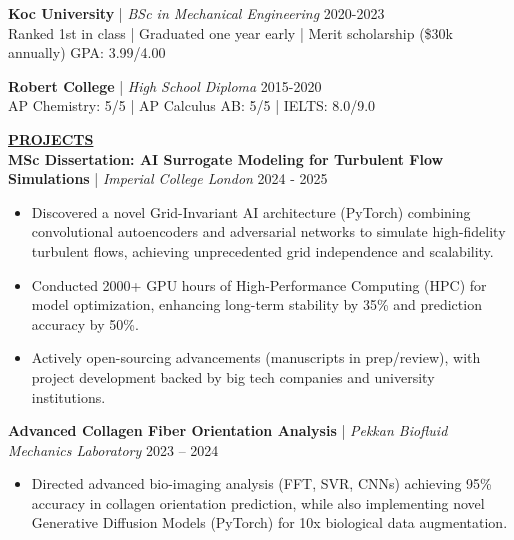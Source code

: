 \documentclass{article}
\newlength{\remaining}
\renewcommand{\section}[1]{
  \vspace{1.0em}\setlength{\remaining}{\textwidth-\widthof{\uppercase{#1}}}
    \noindent\underline{\fontsize{10}{15}\bfseries\uppercase{#1}\hspace*{\remaining}} \\
}
\renewcommand{\subsection}[3]{
    \noindent\textbf{#1} | \emph{#2} \hfill #3  
}
\begin{document}
    \vspace{0.25em}

    \subsection{Koc University}{BSc in Mechanical Engineering}{2020-2023} \\
    Ranked 1st in class | Graduated one year early | Merit scholarship (\$30k annually) \hfill GPA: 3.99/4.00

    \vspace{0.25em}

    \subsection{Robert College}{High School Diploma}{2015-2020} \\
    AP Chemistry: 5/5 | AP Calculus AB: 5/5 | IELTS: 8.0/9.0

    \section{Projects}
    \subsection{MSc Dissertation: AI Surrogate Modeling for Turbulent Flow Simulations}{Imperial College London}{2024 - 2025} 
    \begin{itemize} 
        \item Discovered a novel Grid-Invariant AI architecture (PyTorch) combining convolutional autoencoders and adversarial networks to simulate high-fidelity turbulent flows, achieving unprecedented grid independence and scalability.
        \item Conducted 2000+ GPU hours of High-Performance Computing (HPC) for model optimization, enhancing long-term stability by 35\% and prediction accuracy by 50\%.
        \item Actively open-sourcing advancements (manuscripts in prep/review), with project development backed by big tech companies and university institutions.
    \end{itemize}

    \subsection{Advanced Collagen Fiber Orientation Analysis}{Pekkan Biofluid Mechanics Laboratory}{2023 – 2024}
    \begin{itemize}
        \item Directed advanced bio-imaging analysis (FFT, SVR, CNNs) achieving 95\% accuracy in collagen orientation prediction, while also implementing novel Generative Diffusion Models (PyTorch) for 10x biological data augmentation.
    \end{itemize}
\end{document}
